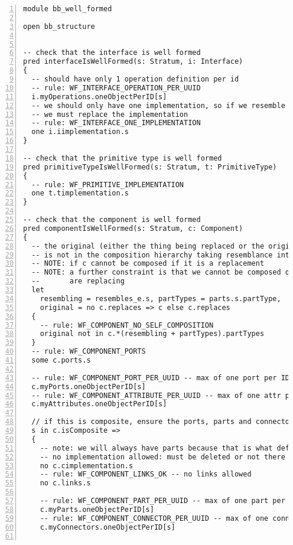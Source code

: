 \lstset{frame=tb, aboveskip=12pt, belowskip=-3pt, breaklines=true, tabsize=2, mathescape=true}
\begin{lstlisting}[caption={bb\_well\_formed.als}, numbers=left]
module bb_well_formed

open bb_structure


-- check that the interface is well formed
pred interfaceIsWellFormed(s: Stratum, i: Interface)
{
  -- should have only 1 operation definition per id
  -- rule: WF_INTERFACE_OPERATION_PER_UUID
  i.myOperations.oneObjectPerID[s]
  -- we should only have one implementation, so if we resemble something
  -- we must replace the implementation
  -- rule: WF_INTERFACE_ONE_IMPLEMENTATION
  one i.iimplementation.s
}

-- check that the primitive type is well formed
pred primitiveTypeIsWellFormed(s: Stratum, t: PrimitiveType)
{
  -- rule: WF_PRIMITIVE_IMPLEMENTATION
  one t.timplementation.s
}

-- check that the component is well formed
pred componentIsWellFormed(s: Stratum, c: Component)
{
  -- the original (either the thing being replaced or the original)
  -- is not in the composition hierarchy taking resemblance into account
  -- NOTE: if c cannot be composed if it is a replacement
  -- NOTE: a further constraint is that we cannot be composed of the thing we
  --       are replacing
  let
    resembling = resembles_e.s, partTypes = parts.s.partType,
    original = no c.replaces => c else c.replaces
  {
    -- rule: WF_COMPONENT_NO_SELF_COMPOSITION
    original not in c.*(resembling + partTypes).partTypes
  }
  -- rule: WF_COMPONENT_PORTS
  some c.ports.s
  
  -- rule: WF_COMPONENT_PORT_PER_UUID -- max of one port per ID
  c.myPorts.oneObjectPerID[s]
  -- rule: WF_COMPONENT_ATTRIBUTE_PER_UUID -- max of one attr per ID
  c.myAttributes.oneObjectPerID[s]
  
  // if this is composite, ensure the ports, parts and connectors are well formed
  s in c.isComposite =>
  {
    -- note: we will always have parts because that is what defines a composite
    -- no implementation allowed: must be deleted or not there to begin with to be a well formed composite
    no c.cimplementation.s
    -- rule: WF_COMPONENT_LINKS_OK -- no links allowed
    no c.links.s
  
    -- rule: WF_COMPONENT_PART_PER_UUID -- max of one part per ID
    c.myParts.oneObjectPerID[s]
    -- rule: WF_COMPONENT_CONNECTOR_PER_UUID -- max of one connector per ID
    c.myConnectors.oneObjectPerID[s]


\end{lstlisting}
